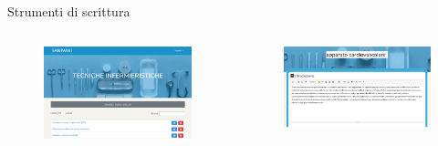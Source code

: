 \documentclass{beamer}
\begin{document}
\begin{frame}[plain]{Strumenti di scrittura}
\begin{columns}
	\begin{figure}[!h]
		\includegraphics[scale=0.17]{saniwiki_modificaeliminaArticolo.png}
	\end{figure}
	\begin{figure}[!h]
		\includegraphics[scale=0.21]{saniwiki_modificaarticolo.png}
	\end{figure}
\end{columns}
\end{frame}
\end{document}
